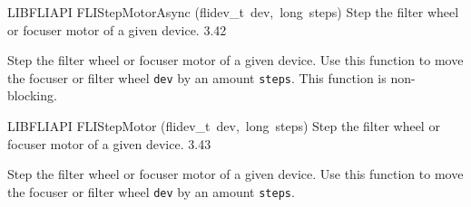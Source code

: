 \documentclass{article}
\begin{document}
\begin{cxxentry}
\begin{cxxfunction}
\begin{cxxdoc}
\end{cxxdoc}
\end{cxxfunction}
\begin{cxxfunction}
{LIBFLIAPI}
        {FLIStepMotorAsync}
        {(flidev\_t\ dev,\ long\ steps)}
        { Step the filter wheel or focuser motor of a given device.}
        {3.42}
\begin{cxxdoc}

Step the filter wheel or focuser motor of a given device.  Use this
function to move the focuser or filter wheel \texttt{dev} by an
amount \texttt{steps}. This function is non-blocking.


\end{cxxdoc}
\end{cxxfunction}
\begin{cxxfunction}
{LIBFLIAPI}
        {FLIStepMotor}
        {(flidev\_t\ dev,\ long\ steps)}
        { Step the filter wheel or focuser motor of a given device.}
        {3.43}
\begin{cxxdoc}

Step the filter wheel or focuser motor of a given device.  Use this
function to move the focuser or filter wheel \texttt{dev} by an
amount \texttt{steps}.



\end{cxxdoc}
\end{cxxfunction}
\end{cxxentry}
\end{document}
